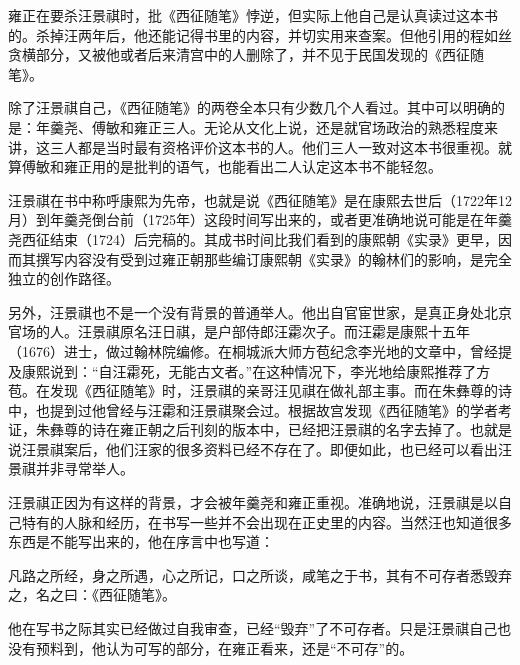 
雍正在要杀汪景祺时，批《西征随笔》悖逆，但实际上他自己是认真读过这本书的。杀掉汪两年后，他还能记得书里的内容，并切实用来查案。但他引用的程如丝贪横部分，又被他或者后来清宫中的人删除了，并不见于民国发现的《西征随笔》。



除了汪景祺自己，《西征随笔》的两卷全本只有少数几个人看过。其中可以明确的是：年羹尧、傅敏和雍正三人。无论从文化上说，还是就官场政治的熟悉程度来讲，这三人都是当时最有资格评价这本书的人。他们三人一致对这本书很重视。就算傅敏和雍正用的是批判的语气，也能看出二人认定这本书不能轻忽。



汪景祺在书中称呼康熙为先帝，也就是说《西征随笔》是在康熙去世后（1722年12月）到年羹尧倒台前（1725年）这段时间写出来的，或者更准确地说可能是在年羹尧西征结束（1724）后完稿的。其成书时间比我们看到的康熙朝《实录》更早，因而其撰写内容没有受到过雍正朝那些编订康熙朝《实录》的翰林们的影响，是完全独立的创作路径。



另外，汪景祺也不是一个没有背景的普通举人。他出自官宦世家，是真正身处北京官场的人。汪景祺原名汪日祺，是户部侍郎汪霦次子。而汪霦是康熙十五年（1676）进士，做过翰林院编修。在桐城派大师方苞纪念李光地的文章中，曾经提及康熙说到：“自汪霦死，无能古文者。”在这种情况下，李光地给康熙推荐了方苞。在发现《西征随笔》时，汪景祺的亲哥汪见祺在做礼部主事。而在朱彝尊的诗中，也提到过他曾经与汪霦和汪景祺聚会过。根据故宫发现《西征随笔》的学者考证，朱彝尊的诗在雍正朝之后刊刻的版本中，已经把汪景祺的名字去掉了。也就是说汪景祺案后，他们汪家的很多资料已经不存在了。即便如此，也已经可以看出汪景祺并非寻常举人。



汪景祺正因为有这样的背景，才会被年羹尧和雍正重视。准确地说，汪景祺是以自己特有的人脉和经历，在书写一些并不会出现在正史里的内容。当然汪也知道很多东西是不能写出来的，他在序言中也写道：



\begin{bookquote}凡路之所经，身之所遇，心之所记，口之所谈，咸笔之于书，其有不可存者悉毁弃之，名之曰：《西征随笔》。\end{bookquote}


他在写书之际其实已经做过自我审查，已经“毁弃”了不可存者。只是汪景祺自己也没有预料到，他认为可写的部分，在雍正看来，还是“不可存”的。


